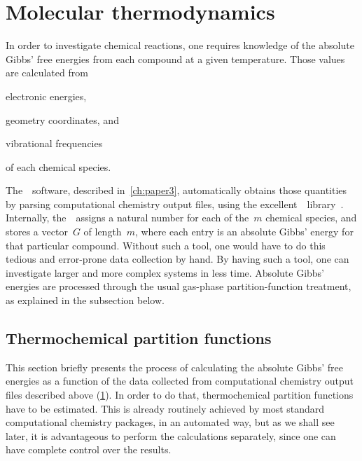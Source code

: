 \section{Molecular thermodynamics}%
\label{sec:mol-thermo}

In order to investigate chemical reactions,
one requires knowledge of the absolute Gibbs' free energies from each compound at a given temperature.
Those values are calculated from
\begin{enumerate*}
	\item electronic energies,
	\item geometry coordinates,
	      and
	\item vibrational frequencies
\end{enumerate*}
of each chemical species.

The~\overreact{}~software,
described in~\cref{ch:paper3},
automatically obtains those quantities by parsing computational chemistry output files,
using the excellent~\cclib{}~library~\cite{O_boyle_2008}.
Internally,
the~\overreact{}~assigns a natural number for each of the~$m$ chemical species,
and stores a vector~$G$ of length~$m$,
where each entry is an absolute Gibbs' energy for that particular compound.
Without such a tool,
one would have to do this tedious and error-prone data collection by hand.
By having such a tool,
one can investigate larger and more complex systems in less time.
Absolute Gibbs' energies are processed through the usual gas-phase partition-function treatment,
as explained in the subsection below.

\subsection{Thermochemical partition functions}%
\label{sec:rrho}

This section briefly presents the process of calculating
the absolute Gibbs' free energies as a function of the data collected
from computational chemistry output files described above (\cref{sec:mol-thermo}).
In order to do that,
thermochemical partition
functions have to be estimated.
This is already routinely achieved by most standard computational chemistry packages,
in an automated way,
but as we shall see later,
it is advantageous to perform
the calculations separately,
since one can have complete control over the results.

